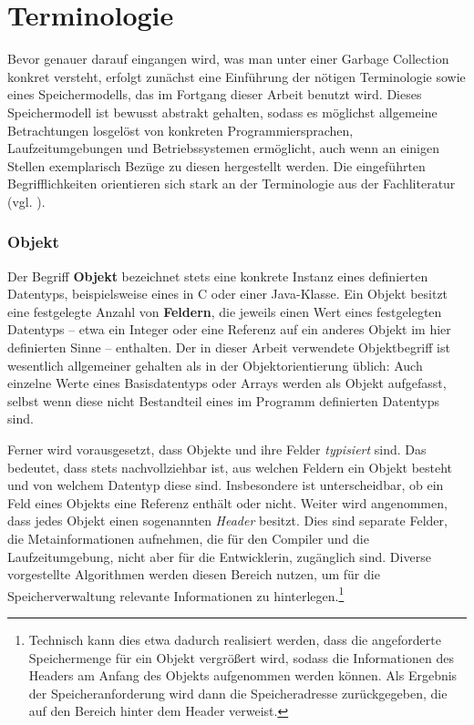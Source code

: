 \section{Terminologie}
\label{sec:intro:terminologie}
Bevor genauer darauf eingangen wird, was man unter einer Garbage Collection konkret versteht, erfolgt zunächst eine Einführung der nötigen Terminologie sowie eines Speichermodells, das im Fortgang dieser Arbeit benutzt wird.
Dieses Speichermodell ist bewusst abstrakt gehalten, sodass es möglichst allgemeine Betrachtungen losgelöst von konkreten Programmiersprachen, Laufzeitumgebungen und Betriebssystemen ermöglicht, auch wenn an einigen Stellen exemplarisch Bezüge zu diesen hergestellt werden.
Die eingeführten Begrifflichkeiten orientieren sich stark an der Terminologie aus der Fachliteratur (vgl. \cite[Kap. 1]{jones-lins}).

\subsubsection*{Objekt}
Der Begriff \textbf{Objekt} bezeichnet stets eine konkrete Instanz eines definierten Datentyps, beispielsweise eines  in C oder einer Java-Klasse.
Ein Objekt besitzt eine festgelegte Anzahl von \textbf{Feldern}, die jeweils einen Wert eines festgelegten Datentyps -- etwa ein Integer oder eine Referenz auf ein anderes Objekt im hier definierten Sinne -- enthalten.
Der in dieser Arbeit verwendete Objektbegriff ist wesentlich allgemeiner gehalten als in der Objektorientierung üblich:
Auch einzelne Werte eines Basisdatentyps oder Arrays werden als Objekt aufgefasst, selbst wenn diese nicht Bestandteil eines im Programm definierten Datentyps sind.

Ferner wird vorausgesetzt, dass Objekte und ihre Felder \textit{typisiert} sind.
Das bedeutet, dass stets nachvollziehbar ist, aus welchen Feldern ein Objekt besteht und von welchem Datentyp diese sind.
Insbesondere ist unterscheidbar, ob ein Feld eines Objekts eine Referenz enthält oder nicht.
Weiter wird angenommen, dass jedes Objekt einen sogenannten \textit{Header} besitzt.
Dies sind separate Felder, die Metainformationen aufnehmen, die für den Compiler und die Laufzeitumgebung, nicht aber für die Entwicklerin, zugänglich sind.
Diverse vorgestellte Algorithmen werden diesen Bereich nutzen, um für die Speicherverwaltung relevante Informationen zu hinterlegen.\footnote{Technisch kann dies etwa dadurch realisiert werden, dass die angeforderte Speichermenge für ein Objekt vergrößert wird, sodass die Informationen des Headers am Anfang des Objekts aufgenommen werden können.
Als Ergebnis der Speicheranforderung wird dann die Speicheradresse zurückgegeben, die auf den Bereich hinter dem Header verweist.}

